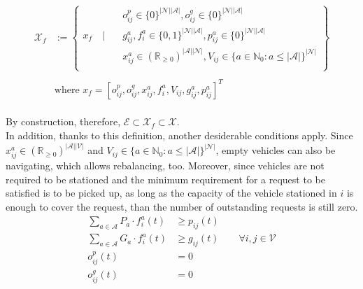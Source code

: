 \begin{equation}
	\begin{aligned}
	\mathcal{X}_f &:= \left\{
	\begin{aligned}
		& o^p_{ij} \in \{0\}^{|\mathcal{N}||\mathcal{A}|} , o^g_{ij} \in \{0\}^{|\mathcal{N}||\mathcal{A}|}  \\
		x_f \quad \Bigg| \quad &g^a_{ij},f^a_{i} \in \{0,1\}^{|\mathcal{N}||\mathcal{A}|},  p^a_{ij}\in \{0\}^{|\mathcal{N}||\mathcal{A}|}\\%
		&  x_{ij}^a\in (\mathbb{R}_{\ge 0})^{|\mathcal{A}||\mathcal{N}|}, V_{ij} \in \{ a \in \mathbb{N}_0: a \leq |\mathcal{A}| \}^{|\mathcal{N}|}\\%
	\end{aligned}
	\right\}\\
	&\\
	&\text{where }  x_f = [o^p_{ij},o^g_{ij}, x_{ij}^a, f^a_{i}, V_{ij} , g^a_{ij}, p^a_{ij}]^T
	\end{aligned}
	\label{eq:final_x_f}
\end{equation}\\
By construction, therefore, $\mathcal{E} \subset \mathcal{X}_f \subset \mathcal{X}$. \\
In addition, thanks to this definition, another desiderable conditions apply. Since $ x_{ij}^a\in (\mathbb{R}_{\ge 0})^{|\mathcal{A}||\mathcal{V}|}$ and $V_{ij} \in \{ a \in \mathbb{N}_0 : a \leq |\mathcal{A}| \}^{|\mathcal{N}|}$, empty vehicles can also be navigating, which allows rebalancing, too. Moreover, since vehicles are not required to be stationed and the minimum requirement for a request to be satisfied is to be picked up, as long as the capacity of the vehicle stationed in $i$ is enough to cover the request, than the number of outstanding requests is still zero. 
\begin{equation}
\begin{aligned}
	\sum_{a \in \mathcal{A}}  P_a\cdot f^a_{i}(t) &\ge p_{ij}(t) \\
	\sum_{a \in \mathcal{A}} G_a \cdot f^a_{i}(t) &\ge  g_{ij}(t) \quad\quad \forall i,j\in\mathcal{V}\\
	o^p_{ij}(t) &=0\\
	o^g_{ij}(t) &=0\\
\end{aligned}
\label{eq:conserved_rela}
\end{equation}
